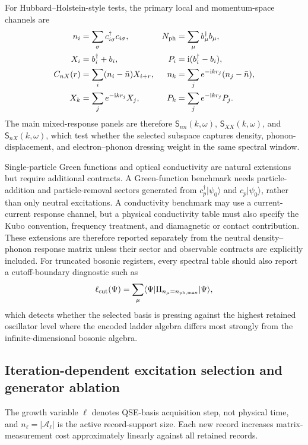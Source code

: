 \documentclass[
  reprint,
  amsmath,
  amssymb,
  aps,
  pra,
  nofootinbib,
  superscriptaddress,
  floatfix
]{revtex4-2}
\newcommand{\Acal}{\mathcal{A}}
\newcommand{\ii}{\mathrm{i}}
\newcommand{\phmax}{n_{\mathrm{ph,max}}}
\newcommand{\ket}[1]{|#1\rangle}
\newcommand{\bra}[1]{\langle #1|}
\begin{document}
For Hubbard--Holstein-style tests, the primary local and momentum-space channels are
\begin{align}
n_i&=\sum_\sigma c_{i\sigma}^\dagger c_{i\sigma},
&
N_{\rm ph}&=\sum_\mu b_\mu^\dagger b_\mu,
\nonumber\\
X_i&=b_i^\dagger+b_i,
&
P_i&=\ii(b_i^\dagger-b_i),
\nonumber\\
C_{nX}(r)&=\sum_i(n_i-\bar n)X_{i+r},
&
n_k&=\sum_j e^{-\ii kr_j}(n_j-\bar n),
\nonumber\\
X_k&=\sum_j e^{-\ii kr_j}X_j,
&
P_k&=\sum_j e^{-\ii kr_j}P_j .
\label{eq:fb_observables}
\end{align}
The main mixed-response panels are therefore $\mathsf S_{nn}(k,\omega)$, $\mathsf S_{XX}(k,\omega)$, and $\mathsf S_{nX}(k,\omega)$, which test whether the selected subspace captures density, phonon-displacement, and electron--phonon dressing weight in the same spectral window.

Single-particle Green functions and optical conductivity are natural extensions but require additional contracts.  A Green-function benchmark needs particle-addition and particle-removal sectors generated from $c_p^\dagger\ket{\psi_0}$ and $c_p\ket{\psi_0}$, rather than only neutral excitations.  A conductivity benchmark may use a current-current response channel, but a physical conductivity table must also specify the Kubo convention, frequency treatment, and diamagnetic or contact contribution.  These extensions are therefore reported separately from the neutral density--phonon response matrix unless their sector and observable contracts are explicitly included.
For truncated bosonic registers, every spectral table should also report a cutoff-boundary diagnostic such as
\begin{equation}
\ell_{\rm cut}(\Psi)=
\sum_{\mu}\bra{\Psi}\Pi_{n_\mu=\phmax}\ket{\Psi},
\label{eq:boson_cutoff_leakage}
\end{equation}
which detects whether the selected basis is pressing against the highest retained oscillator level where the encoded ladder algebra differs most strongly from the infinite-dimensional bosonic algebra.

\subsection{Iteration-dependent excitation selection and generator ablation}

The growth variable $\ell$ denotes QSE-basis acquisition step, not physical time, and $n_\ell=|\Acal_\ell|$ is the active record-support size.  Each new record increases matrix-measurement cost approximately linearly against all retained records.
\end{document}
